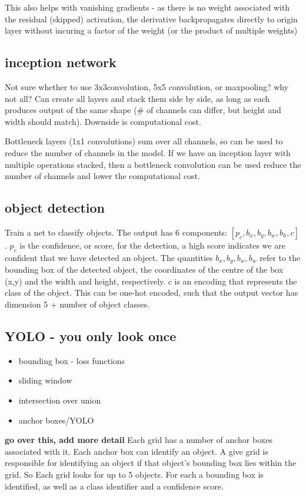 \documentclass{article}
\begin{document}
This also helps with vanishing gradients - as there is no weight associated with the residual (skipped) activation, the derivative backpropagates directly to origin layer without incuring a factor of the weight (or the product of multiple weights)

\subsection{inception network}
Not sure whether to use 3x3convolution, 5x5 convolution, or maxpooling? why not all? Can create all layers and stack them side by side, as long as each produces output of the same shape (\# of channels can differ, but height and width should match).
Downside is computational cost.

Bottleneck layers (1x1 convolutions) sum over all channels, so can be used to reduce the number of channels in the model. If we have an inception layer with multiple operations stacked, then a bottleneck convolution can be used reduce the number of channels and lower the computational cost.

\subsection{object detection}
Train a net to classify objects. The output has 6 components: $[p_c, b_x, b_y, b_w, b_h, c]$. $p_c$ is the confidence, or score, for the detection, a high score indicates we are confident that we have detected an object. The quantities $b_x, b_y, b_w, b_w$ refer to the bounding box of the detected object, the coordinates of the centre of the box (x,y) and the width and height, respectively. $c$ is an encoding that represents the class of the object. This can be one-hot encoded, such that the output vector has dimension 5 + number of object classes.



\subsection{YOLO - you only look once}
\begin{itemize}
	\item bounding box - loss functions
	\item sliding window
	\item intersection over union
	\item anchor boxes/YOLO
\end{itemize}
{\bf go over this, add more detail}
Each grid has a number of anchor boxes associated with it. Each anchor box can identify an object. A give grid is responsible for identifying an object if that object's bounding box lies within the grid.
So Each grid looks for up to 5 objects. For each a bounding box is identified, as well as a class identifier and a confidence score. 
\end{document}
